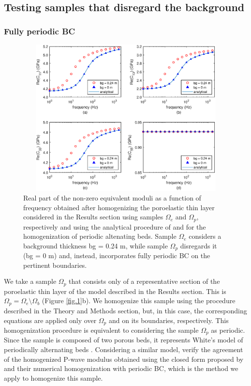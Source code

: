 \documentclass[draft]{agujournal2019}
\begin{document}
\subsection{Testing samples that disregard the background}

\subsubsection{Fully periodic BC}

\begin{figure}[!ht]
\centering
        \includegraphics[width= 120mm, height=80mm]{Figure4.eps}
\caption{Real part of the non-zero equivalent moduli as a function of frequency obtained after homogenizing the poroelastic thin layer considered in the Results section using samples $\Omega_e$ and $\Omega_p$, respectively and using the analytical procedure of  and  for the homogenization of periodic altenating beds. Sample $\Omega_e$ considers a background thickness bg = 0.24 m, while sample $\Omega_p$ disregards it (bg = 0 m) and, instead, incorporates fully periodic BC on the pertinent boundaries. }
\label{fig.4}
\end{figure}

We take a sample $\Omega_p$ that consists only of a representative section of the poroelastic thin layer of the model described in the Results section. This is $\Omega_p = \Omega_e  \setminus \Omega_b $ (Figure \ref{fig.1}b). We homogenize this sample using the procedure described in the Theory and Methods section, but, in this case, the corresponding equations are applied only  over $\Omega_p$ and on its boundaries, respectively. 
This homogenization procedure is equivalent to considering the sample $\Omega_p$ as periodic. Since the sample is composed of two porous beds, it represents White's model of periodically alternating beds \cite{White1975}. 
Considering a similar model,  verify the agreement of the homogenized P-wave modulus obtained using the closed form proposed by  and their numerical homogenization with periodic BC, which is the method we apply to homogenize this sample.
\end{document}
